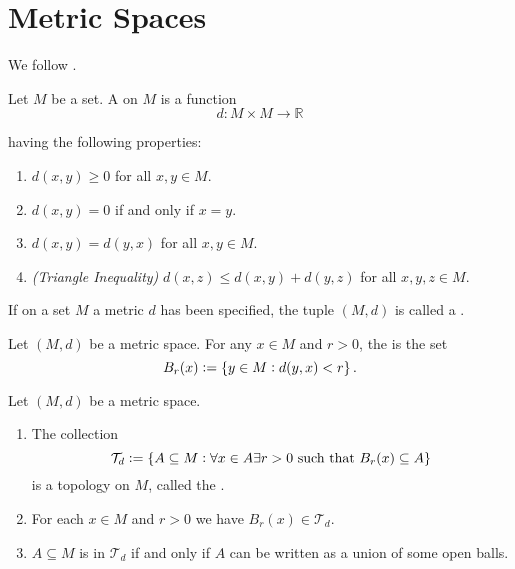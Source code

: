 \section{Metric Spaces}
We follow \cite[396 -- 398]{lee:topological_manifolds:2011}.

\begin{definition}
	Let $M$ be a set. A  on $M$ is a function 	
	\begin{equation}
		d: M \times M \to \mathbb {R}
	\end{equation}

	\noindent having the following properties:

	\begin{enumerate}
		\item $d(x,y) \geq 0$ for all $x,y \in M$.
		\item $d(x,y) = 0$ if and only if $x = y$.
		\item $d(x,y) = d(y,x)$ for all $x,y \in M$.
		\item \emph{(Triangle Inequality)} $d(x,z) \leq d(x,y) + d(y,z)$ for all $x,y,z \in M$.

	\end{enumerate}
	
	If on a set $M$ a metric $d$ has been specified, the tuple $(M,d)$ is called a .
\end{definition}

\begin{definition}
	Let $(M,d)$ be a metric space. For any $x \in M$ and $r > 0$, the  is the set 
	\begin{equation}
		B_r(x) := \cbr[0]{y \in M : d(y,x) < r}.
	\end{equation}
\end{definition}

\begin{proposition}
	Let $(M,d)$ be a metric space. 
	
	\begin{enumerate}[label = \textup{(}\alph*\textup{)}]
		\item The collection
			\begin{equation}
				\mathcal{T}_d := \cbr[0]{A \subseteq M :  \forall x \in A \exists r > 0 \text{ such that } B_r(x) \subseteq A}
			\end{equation}
			\noindent is a topology on $M$, called the .
		
		\item For each $x \in M$ and $r > 0$ we have $B_r(x) \in \mathcal{T}_d$.
		\item $A \subseteq M$ is in $\mathcal{T}_d$ if and only if $A$ can be written as a union of some open balls.
	\end{enumerate}
\end{proposition}

